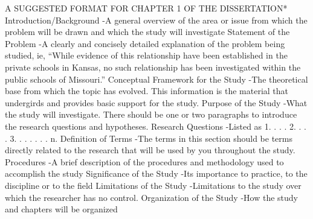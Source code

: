 A SUGGESTED FORMAT FOR CHAPTER 1 OF THE DISSERTATION*  
Introduction/Background
-A general overview of the area or issue from which the problem will be drawn and which the study will investigate
Statement of the Problem
-A clearly and concisely detailed explanation of the problem being studied, ie, “While evidence of this relationship have been established in the private schools in Kansas, no such relationship has been investigated within the public schools of Missouri.”  
Conceptual Framework for the Study
-The theoretical base from which the topic has evolved. This information is the material that undergirds and provides basic support for the study.
Purpose of the Study
-What the study will investigate. There should be one or two paragraphs to introduce the research questions and hypotheses.
Research Questions
-Listed as 1. . . . 2. . . . 3. . . . . . . n.
Definition of Terms
-The terms in this section should be terms directly related to the research that will be used by you throughout the study.  
Procedures  
-A brief description of the procedures and methodology used to accomplish the study
Significance of the Study
-Its importance to practice, to the discipline or to the field
Limitations of the Study
-Limitations to the study over which the researcher has no control.  
Organization of the Study
-How the study and chapters will be organized

\fi



